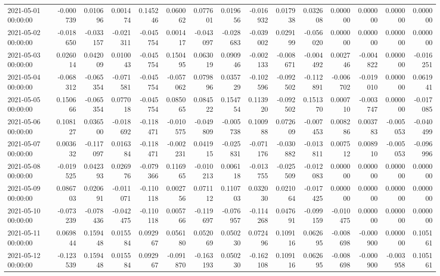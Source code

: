 \begin{tabular}{lrrrrrrrrrrrrrr}
2021-05-01 00:00:00 & -0.000739 & 0.010696 & 0.001474 & 0.145246 & 0.060062 & 0.077601 & 0.019656 & -0.016932 & 0.017938 & 0.032608 & 0.000000 & 0.000000 & 0.000000 & 0.000000 \\
2021-05-02 00:00:00 & -0.018650 & -0.033157 & -0.021311 & -0.045754 & 0.001417 & -0.043097 & -0.028683 & -0.039002 & 0.029199 & -0.056020 & 0.000000 & 0.000000 & 0.000000 & 0.000000 \\
2021-05-03 00:00:00 & 0.026014 & 0.042009 & 0.010043 & -0.045754 & 0.150495 & 0.063019 & 0.090946 & -0.002133 & -0.008671 & -0.004492 & 0.002746 & -0.004822 & 0.000000 & -0.016251 \\
2021-05-04 00:00:00 & -0.068312 & -0.065354 & -0.071581 & -0.045754 & -0.057062 & 0.079896 & 0.035729 & -0.102596 & -0.092502 & -0.112891 & -0.006702 & -0.019010 & 0.000000 & 0.061941 \\
2021-05-05 00:00:00 & 0.150666 & -0.065354 & 0.077018 & -0.045754 & 0.085065 & 0.084522 & 0.154754 & 0.113920 & -0.092502 & 0.151370 & 0.000710 & -0.003747 & 0.000000 & -0.017085 \\
2021-05-06 00:00:00 & 0.108127 & 0.036500 & -0.018692 & -0.118471 & -0.010575 & -0.049809 & -0.005738 & 0.100988 & 0.072609 & -0.007453 & 0.008286 & 0.003783 & -0.005053 & -0.040499 \\
2021-05-07 00:00:00 & 0.003632 & -0.117097 & 0.016384 & -0.118471 & -0.002231 & 0.041915 & -0.025831 & -0.071176 & -0.030882 & -0.013811 & 0.007512 & 0.008910 & -0.005053 & -0.096996 \\
2021-05-08 00:00:00 & -0.019525 & 0.042393 & 0.026976 & -0.079366 & 0.116965 & -0.010213 & 0.006118 & -0.013755 & -0.025509 & -0.012083 & 0.000000 & 0.000000 & 0.000000 & 0.000000 \\
2021-05-09 00:00:00 & 0.086703 & 0.020691 & -0.011071 & -0.110118 & 0.002756 & 0.071112 & 0.110703 & 0.032030 & 0.021064 & -0.017425 & 0.000000 & 0.000000 & 0.000000 & 0.000000 \\
2021-05-10 00:00:00 & -0.073239 & -0.078436 & -0.042475 & -0.110118 & 0.005766 & -0.119697 & -0.076957 & -0.114268 & 0.047691 & -0.099159 & -0.010475 & 0.000000 & 0.000000 & 0.000000 \\
2021-05-11 00:00:00 & 0.069844 & 0.159448 & 0.015584 & 0.092967 & 0.056180 & 0.052069 & 0.050230 & 0.072496 & 0.109116 & 0.062695 & -0.008698 & -0.000900 & 0.000000 & 0.105161 \\
2021-05-12 00:00:00 & -0.123539 & 0.159448 & 0.015584 & 0.092967 & -0.091870 & -0.163193 & 0.050230 & -0.162108 & 0.109116 & 0.062695 & -0.008698 & -0.000900 & -0.003958 & 0.105161 \\

\end{tabular}
